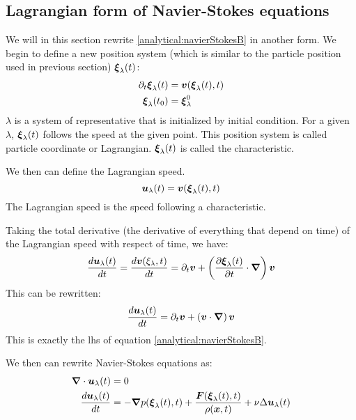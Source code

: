 \subsection{Lagrangian form of Navier-Stokes equations}
\label{analytical:convectif}
We will in this section rewrite \ref{analytical:navierStokesB} in another form.
We begin to define a new position system (which is similar to the particle position used in previous section) ${\boldsymbol {\xi}}_{\lambda}(t)$:
\begin{subequations}
\begin{align}
 \partial_t {\boldsymbol {\xi}}_{\lambda}(t)&={\boldsymbol {v}}({\boldsymbol {\xi}}_{\lambda}(t),t)\\
 {\boldsymbol {\xi}}_{\lambda}(t_0)&={\boldsymbol {\xi}}^{0}_{\lambda}
\end{align}
\end{subequations}
$\lambda$ is a system of representative that is initialized by initial condition.
For a given $\lambda$, ${\boldsymbol {\xi}}_{\lambda}(t)$ follows the speed at the given point.
This position system is called particle coordinate or Lagrangian.
${\boldsymbol {\xi}}_\lambda(t)$ is called the characteristic.

We then can define the Lagrangian speed.
\begin{equation}
 {\boldsymbol {u}}_{\lambda}(t)={\boldsymbol {v}}({\boldsymbol {\xi}}_{\lambda}(t),t)
\end{equation}
The Lagrangian speed is the speed following a characteristic.

Taking the total derivative (the derivative of everything that depend on time) of the Lagrangian speed with respect of time, we have:
\begin{equation}
\frac{d {\boldsymbol {u}}_{\lambda}(t)}{d t}=\frac{d {\boldsymbol {v}}(\xi_{\lambda},t)}{d t}=\partial_t {\boldsymbol {v}}+\left(\frac{\partial {\boldsymbol {\xi}}_{\lambda}(t)}{\partial t}\cdot{\boldsymbol {\nabla}}\right){\boldsymbol {v}}
\end{equation}
This can be rewritten:
\begin{equation}
\frac{d {\boldsymbol {u}}_{\lambda}(t)}{d t}=\partial_t {\boldsymbol {v}}+\left({\boldsymbol {v}} \cdot{\boldsymbol {\nabla}}\right){\boldsymbol {v}}
\end{equation}
This is exactly the lhs of equation \ref{analytical:navierStokesB}.

We then can rewrite Navier-Stokes equations as:
\begin{subequations}
\begin{align}
\label{analytical:navierStokesLagA}
{\boldsymbol {\nabla}} \cdot {\boldsymbol {u}}_{\lambda}(t)&=0\\
\label{analytical:navierStokesLagB}
\frac{d {\boldsymbol {u}}_{\lambda}(t)}{d t}&=-{\boldsymbol {\nabla}} p({\boldsymbol {\xi}}_{\lambda}(t),t)+\frac{{\boldsymbol {F}}({\boldsymbol {\xi}}_{\lambda}(t),t)}{\rho({\boldsymbol {x}},t)}+\nu \Delta {\boldsymbol {u}}_{\lambda}(t)
\end{align}
\end{subequations}

